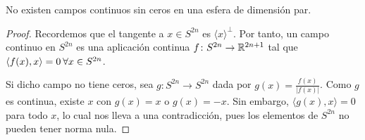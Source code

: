 \begin{corollary}
  No existen campos continuos sin ceros en una esfera de dimensión par.
\end{corollary}

\begin{proof}
  Recordemos que el tangente a $x \in S^{2n}$ es $\langle x \rangle^\perp$. Por tanto, un campo continuo en $S^{2n}$ es una aplicación
  continua $f \colon S^{2n} \to \mathbb{R}^{2n+1}$ tal que $\langle f(x), x\rangle = 0 \hspace{0.2em} \forall x \in S^{2n}$.

  Si dicho campo no tiene ceros, sea $g \colon S^{2n} \to S^{2n}$ dada por $g(x) = \frac{f(x)}{|f(x)|}$. Como $g$ es
  continua, existe $x$ con $g(x) = x$ o $g(x) = -x$. Sin embargo, $\langle g(x), x\rangle = 0$ para todo $x$, lo cual nos lleva a una
  contradicción, pues los elementos de $S^{2n}$ no pueden tener norma nula.
\end{proof}
